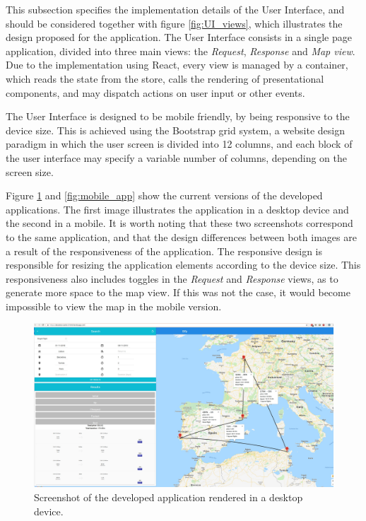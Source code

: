 This subsection specifies the implementation details of the User Interface,
and should be considered together with figure \ref{fig:UI_views},
which illustrates the design proposed for the application.
The User Interface consists in a single page application,
divided into three main views: the \textit{Request}, \textit{Response} and \textit{Map view}.
Due to the implementation using React, every view is managed by a container,
which reads the state from the store, calls the rendering of presentational components,
and may dispatch actions on user input or other events. 

The User Interface is designed to be mobile friendly, by being responsive to the 
device size. This is achieved using the Bootstrap grid system, 
a website design paradigm in which the user screen is divided into 12 columns,
and each block of the user interface may specify a variable number of columns, depending on the screen size.

Figure \ref{fig:desktop_app} and \ref{fig:mobile_app} show the current versions of the developed applications.
The first image illustrates the application in a desktop device and the second in a mobile.
It is worth noting that these two screenshots correspond to the same application,
and that the design differences between both images are a result of the responsiveness of the application.
The responsive design is responsible for resizing the application elements according to the device size.
This responsiveness also includes toggles in the \textit{Request} and \textit{Response} views, as to generate more space 
to the map view. If this was not the case, it would become impossible to view the map in the mobile version.  


\begin{figure}[htpb]
  \centering
  \includegraphics[width=\textwidth]{./imgs/bfly_desktop.jpg}
  \caption{Screenshot of the developed application rendered in a desktop device.}
  \label{fig:desktop_app}  
\end{figure}

